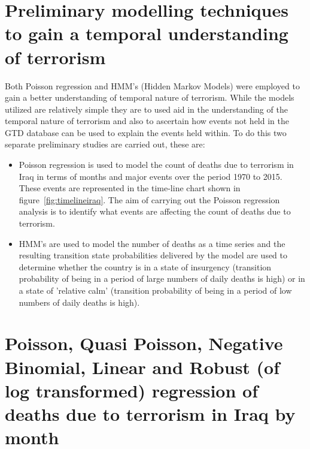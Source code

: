\section{Preliminary modelling techniques to gain a temporal understanding of terrorism}
Both Poisson regression and HMM's (Hidden Markov Models) were employed to gain a better understanding of temporal nature of terrorism. While the models utilized are relatively simple they are to used aid in the understanding of the temporal nature of terrorism and also to ascertain how events not held in the GTD database can be used to explain the events held within. To do this two separate preliminary studies are carried out, these are:
\begin{itemize}
\item Poisson regression is used to model the count of deaths due to terrorism in Iraq in terms of months and major events over the period 1970 to 2015. These events are  represented in the time-line chart shown in figure~\ref{fig:timelineiraq}. The aim of carrying out the Poisson regression analysis is to identify what events are affecting the count of deaths due to terrorism. 
\item HMM's are used to model the number of deaths as a time series and the resulting transition state probabilities delivered by the model are used to determine whether the country is in a state of insurgency (transition probability of being in a period of large numbers of daily deaths is high) or in a state of 'relative calm'  (transition probability of being in a period of low numbers of daily deaths is high).
\end{itemize}

\section{Poisson, Quasi Poisson, Negative Binomial, Linear  and Robust (of log transformed)  regression of deaths due to terrorism in Iraq by month}

